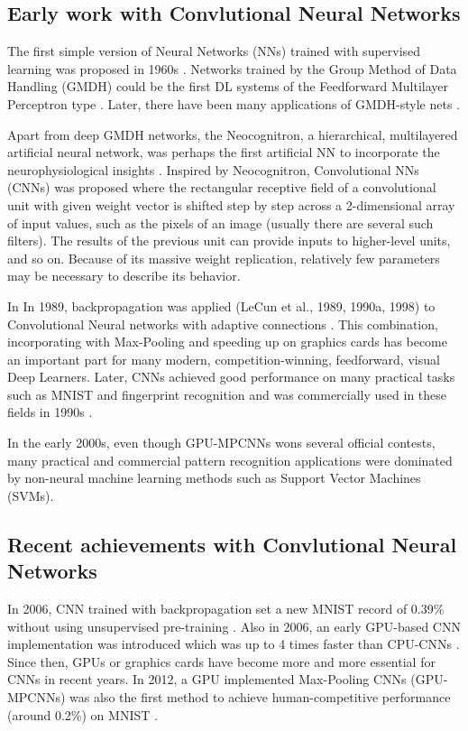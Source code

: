 \subsection{Early work with Convlutional Neural Networks}
The first simple version of Neural Networks (NNs) trained with supervised learning was proposed in 1960s  \cite{rosenblatt1958perceptron}\cite{rosenblatt1962principles}. Networks trained by the Group Method of Data Handling (GMDH) could be the first DL systems of the Feedforward Multilayer Perceptron type \cite{ivakhnenko1965cybernetic}\cite{Schmidhuber14}. Later, there have been many applications of GMDH-style
nets \cite{farlow1984self} \cite{ikeda1976sequential} \cite{kondo2008multi} \cite{witczak2006gmdh}.

Apart from deep GMDH networks, the Neocognitron, a hierarchical, multilayered artificial neural network, was perhaps the first artificial NN to incorporate the
neurophysiological insights \cite{fukushima1980neocognitron}. Inspired by Neocognitron, Convolutional NNs (CNNs) was proposed where the rectangular receptive field of a convolutional unit with given weight vector is shifted step by step across a 2-dimensional array of input values, such as the pixels of an image (usually there are several such filters). The results of the previous unit can provide inputs to higher-level units, and so on. Because of its massive weight replication,  relatively few parameters may be necessary to describe its behavior.

In In 1989, backpropagation was applied (LeCun et al., 1989, 1990a, 1998) to Convolutional Neural networks with adaptive connections \cite{lecun1989backpropagation}. This combination, incorporating with Max-Pooling and speeding up on graphics cards has become an important part for  many modern, competition-winning, feedforward, visual Deep Learners. Later, CNNs achieved good performance on many practical tasks such as MNIST and fingerprint recognition and was commercially used in these fields in 1990s \cite{baldi1993neural} \cite{le1990handwritten}. 

In the early 2000s, even though GPU-MPCNNs wons several official contests, many practical and commercial pattern recognition applications were dominated by non-neural machine learning methods such as Support Vector Machines (SVMs).

\subsection{Recent achievements with Convlutional Neural Networks}
In 2006, CNN trained with backpropagation set a new MNIST record of 0.39\% without using unsupervised pre-training \cite{marc2006efficient}. Also in 2006, an early GPU-based CNN implementation was introduced which was up to 4 times faster than CPU-CNNs \cite{chellapilla2006high}. Since then, GPUs or graphics cards have become more and more essential for CNNs in recent years. In 2012, a GPU implemented Max-Pooling CNNs (GPU-MPCNNs) was also the first method to achieve human-competitive performance (around 0.2\%) on MNIST \cite{ciresan2012multi}.

